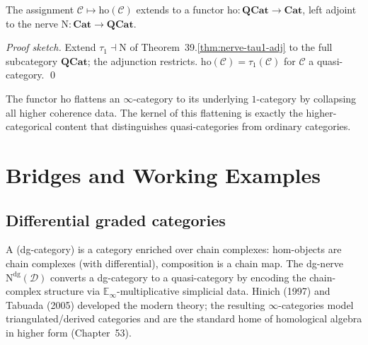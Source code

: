 \begin{corollary}
\label{cor:ho-functor}
The assignment $\mathcal{C} \mapsto \mathrm{ho}(\mathcal{C})$ extends to a
functor $\mathrm{ho} : \mathbf{QCat} \to \mathbf{Cat}$, left adjoint to
the nerve $\mathrm{N} : \mathbf{Cat} \to \mathbf{QCat}$.
\end{corollary}

\begin{proof}[Proof sketch]
Extend $\tau_1 \dashv \mathrm{N}$ of Theorem~39.\ref{thm:nerve-tau1-adj}
to the full subcategory $\mathbf{QCat}$; the adjunction restricts.
$\mathrm{ho}(\mathcal{C}) = \tau_1(\mathcal{C})$ for $\mathcal{C}$ a
quasi-category. \qed
\end{proof}

\begin{remark}
The functor $\mathrm{ho}$ flattens an $\infty$-category to its underlying
$1$-category by collapsing all higher coherence data. The kernel of this
flattening is exactly the higher-categorical content that
distinguishes quasi-categories from ordinary categories.
\end{remark}


\section{Bridges and Working Examples}
\label{sec:qcat-bridges}

\subsection{Differential graded categories}

\begin{nameorigin}
A  (dg-category) is a category
enriched over chain complexes: hom-objects are chain complexes (with
differential), composition is a chain map. The dg-nerve
$\mathrm{N}^{\mathrm{dg}}(\mathcal{D})$ converts a dg-category to a
quasi-category by encoding the chain-complex structure via
$\mathbb{E}_\infty$-multiplicative simplicial data. Hinich (1997) and
Tabuada (2005) developed the modern theory; the resulting
$\infty$-categories model triangulated/derived categories and are the
standard home of homological algebra in higher form (Chapter~53).
\end{nameorigin}

